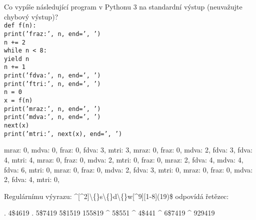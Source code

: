 \documentclass[addpoints,12pt]{exam}
\begin{document}
\begin{questions}
\nopagebreak
\makeemptybox{10cm}
\question[2]
Co vypíše následující program v Pythonu 3 na standardní výstup (neuvažujte chybový výstup)?\\
\texttt{def f(n):\\
\hspace*{0.6cm}print('fraz:', n, end=', ')\\
\hspace*{0.6cm}n += 2\\
\hspace*{0.6cm}while n \textless{} 8:\\
\hspace*{0.6cm}\hspace*{0.6cm}yield n\\
\hspace*{0.6cm}\hspace*{0.6cm}n += 1\\
\hspace*{0.6cm}\hspace*{0.6cm}print('fdva:', n, end=', ')\\
\hspace*{0.6cm}print('ftri:', n, end=', ')\\
n = 0\\
x = f(n)\\
print('mraz:', n, end=', ')\\
print('mdva:', n, end=', ')\\
next(x)\\
print('mtri:', next(x), end=', ')}
\nopagebreak
\begin{choices}
\choice
mraz: 0, mdva: 0, fraz: 0, fdva: 3, mtri: 3,
\choice
mraz: 0, fraz: 0, mdva: 2, fdva: 3, fdva: 4, mtri: 4,
\choice
mraz: 0, fraz: 0, mdva: 2, mtri: 0,
\choice
fraz: 0, mraz: 2, fdva: 4, mdva: 4, fdva: 6, mtri: 0,
\choice
mraz: 0, fraz: 0, mdva: 2, fdva: 3, mtri: 0,
\choice
mraz: 0, fraz: 0, mdva: 2, fdva: 4, mtri: 0,
\end{choices}
\question[2]
Regulárnímu výyrazu: \^{}[\^{}2]\textbackslash\{\}s\textbackslash\{\}d\textbackslash\{\}w[\^{}9][1-8](19)\${} odpovídá řetězec:
\nopagebreak
\begin{choices}
\choice
. 4\${}4619
\choice
. 5\${}7419
 5\${}1519
 155819
\choice
\^{} 5\${}551
\choice
\^{} 4\${}441
\choice
\^{} 6\${}7419
\choice
\^{} 929419
\end{choices}
\end{questions}
\end{document}
